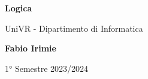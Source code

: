\begin{titlepage}
	\begin{center}
		\vspace*{1cm}

		\Huge
		\textbf{Logica}

		\vspace{0.5cm}
		\LARGE
		UniVR - Dipartimento di Informatica

		\vspace{1.5cm}

		\textbf{Fabio Irimie}

		\vfill


		\vspace{0.8cm}


		1° Semestre 2023/2024

	\end{center}
\end{titlepage}
